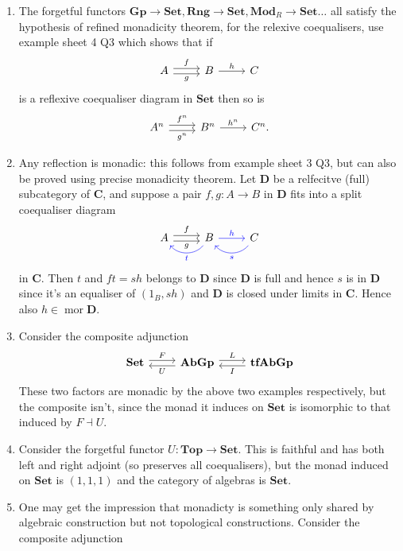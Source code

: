\documentclass[a4paper]{article}
\renewcommand{\c}[1]{\mathbf{#1}}
\DeclareMathOperator{\mor}{mor}
\newcommand{\Set}{{\c{Set}}}
\newcommand{\Top}{{\c{Top}}}
\newcommand{\adjoint}{\dashv}
\begin{document}
\begin{eg}\leavevmode
  \begin{enumerate}
  \item The forgetful functors \(\c{Gp} \to \Set, \c{Rng} \to \Set, \c{Mod}_R \to \Set \dots\) all satisfy the hypothesis of refined monadicity theorem, for the relexive coequalisers, use example sheet 4 Q3 which shows that if
    \[
      \begin{tikzcd}
        A \ar[r, shift left, "f"] \ar[r, shift right, "g"'] & B \ar[r, "h"] & C
      \end{tikzcd}
    \]
    is a reflexive coequaliser diagram in \(\Set\) then so is
    \[
      \begin{tikzcd}
        A^n \ar[r, shift left, "f^n"] \ar[r, shift right, "g^n"'] & B^n \ar[r, "h^n"] & C^n.
      \end{tikzcd}
    \]
  \item Any reflection is monadic: this follows from example sheet 3 Q3, but can also be proved using precise monadicity theorem. Let \(\c D\) be a relfecitve (full) subcategory of \(\c C\), and suppose a pair \(f, g: A \to B\) in \(\c D\) fits into a split coequaliser diagram
    \[
      \begin{tikzcd}
        A \ar[r, shift left, "f"] \ar[r, shift right, "g"'] & B \ar[l, blue, bend left=50, "t"] \ar[r, blue, "h"] & C \ar[l, blue, bend left=50, "s"]
      \end{tikzcd}
    \]
    in \(\c C\). Then \(t\) and \(ft = sh\) belongs to \(\c D\) since \(\c D\) is full and hence \(s\) is in \(\c D\) since it's an equaliser of \((1_B, sh)\) and \(\c D\) is closed under limits in \(\c C\). Hence also \(h \in \mor \c D\).
  \item Consider the composite adjunction
    \[
      \begin{tikzcd}
        \Set \ar[r, shift left, "F"] & \c{AbGp} \ar[l, shift left, "U"] \ar[r, shift left, "L"] & \c{tfAbGp} \ar[l, shift left, "I"]
      \end{tikzcd}
    \]
    These two factors are monadic by the above two examples respectively, but the composite isn't, since the monad it induces on \(\Set\) is isomorphic to that induced by \(F \adjoint U\).
  \item Consider the forgetful functor \(U: \Top \to \Set\). This is faithful and has both left and right adjoint (so preserves all coequalisers), but the monad induced on \(\Set\) is \((1, 1, 1)\) and the category of algebras is \(\Set\).
  \item One may get the impression that monadicty is something only shared by algebraic construction but not topological constructions. Consider the composite adjunction

\end{enumerate}
\end{eg}
\end{document}
